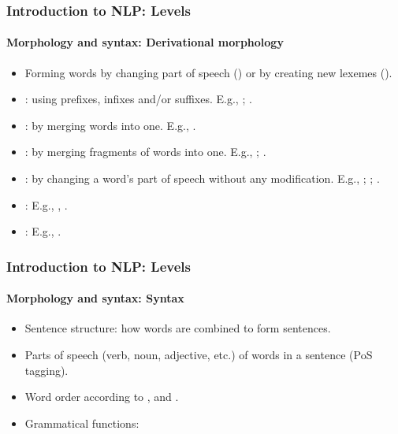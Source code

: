 \documentclass[xcolor=table]{beamer}
\begin{document}
\begin{frame}
\frametitle{Introduction to NLP: Levels}
\framesubtitle{Morphology and syntax: Derivational morphology}

\begin{itemize}
	\item Forming words by changing part of speech () or by creating new lexemes ().
	
	\item {}: using prefixes, infixes and/or suffixes. 
	E.g., ; .
	
	\item {}: by merging words into one.
	E.g., .
	
	\item {}: by merging fragments of words into one.
	E.g., ; .
	
	\item {}: by changing a word's part of speech without any modification. 
	E.g., ; ; .
	
	\item {}:
	E.g., , .
	
	\item {}: E.g., .
	
\end{itemize}

\end{frame}

\begin{frame}
\frametitle{Introduction to NLP: Levels}
\framesubtitle{Morphology and syntax: Syntax}

\begin{itemize}
	\item Sentence structure: how words are combined to form sentences.
	\item Parts of speech (verb, noun, adjective, etc.) of words in a sentence (PoS tagging).
	\item Word order according to ,  and .
	\item Grammatical functions: 
\end{itemize}

\end{frame}
\end{document}
